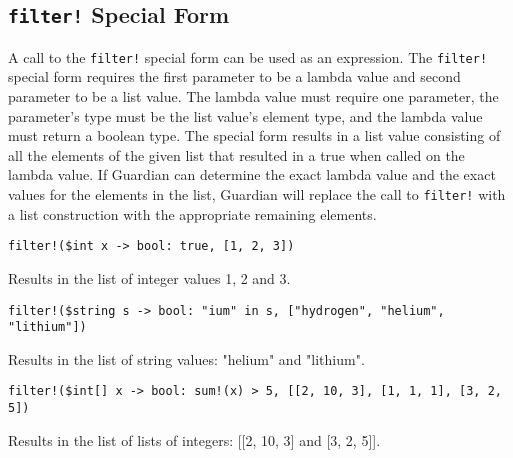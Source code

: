 
\subsection{\texttt{filter!} Special Form}
{
	A call to the \texttt{filter!} special form can be used as an expression.
	The \texttt{filter!} special form requires the first parameter to be
	a lambda value and second parameter to be a list value.
	The lambda value must require one parameter, the parameter's type must
	be the list value's element type, and the lambda value must return a
	boolean type.
	The special form results in a list value consisting of all the elements
	of the given list that resulted in a true when called on the lambda
	value.
	If Guardian can determine the exact lambda value and the exact
	values for the elements in the list, Guardian will replace the call
	to \texttt{filter!} with a list construction with the appropriate
	remaining elements.
	
	\begin{itemize}
	{
		\item \texttt{filter!(\$int x -> bool: true, [1, 2, 3])}
		
			Results in the list of integer values 1, 2 and 3.
		
		\item \texttt{filter!(\$string s -> bool: "ium" in s, ["hydrogen", "helium", "lithium"])}
		
			Results in the list of string values: "helium" and "lithium".
		
		\item \texttt{filter!(\$int[] x -> bool: sum!(x) > 5, [[2, 10, 3], [1, 1, 1], [3, 2, 5])}
			
			Results in the list of lists of integers: [[2, 10, 3] and [3, 2, 5]].
	}
	\end{itemize}
}
